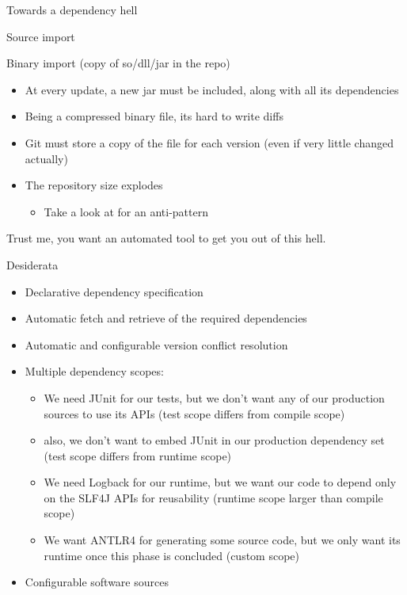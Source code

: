 \documentclass[presentation]{beamer}
\begin{document}
\begin{frame}{Towards a dependency hell}
\begin{block}{Source import}
	\end{block}
	\begin{block}{Binary import (copy of so/dll/jar in the repo)}
		\begin{itemize}
			\item At every update, a new jar must be included, along with all its dependencies
			\item Being a compressed binary file, its hard to write diffs
			\item Git must store a copy of the file for each version (even if very little changed actually)
			\item The repository size explodes
			\begin{itemize}
				\item Take a look at \cite{explodedrepository} for an anti-pattern
			\end{itemize}
		\end{itemize}
	\end{block}
	\begin{block}{}
		Trust me, you want an automated tool to get you out of this hell.
	\end{block}
\end{frame}

\begin{frame}[fragile]{Desiderata}
	\begin{itemize}
		\item Declarative dependency specification
		\item Automatic fetch and retrieve of the required dependencies
		\item Automatic and configurable version conflict resolution
		\item Multiple dependency scopes:
		\begin{itemize}
			\item We need JUnit for our tests, but we don't want any of our production sources to use its APIs (test scope differs from compile scope)
			\item also, we don't want to embed JUnit in our production dependency set (test scope differs from runtime scope)
			\item We need Logback \cite{logback} for our runtime, but we want our code to depend only on the SLF4J APIs for reusability (runtime scope larger than compile scope)
			\item We want ANTLR4 \cite{antlr4} for generating some source code, but we only want its runtime once this phase is concluded (custom scope)
		\end{itemize}
		\item Configurable software sources
	\end{itemize}
\end{frame}
\end{document}
